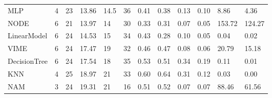\begin{tabular}{lllllrllllll}
MLP & 4 & 23 & 13.86 & 14.5 & 36 & 0.41 & 0.38 & 0.13 & 0.10 & 8.86 & 4.36 \\
NODE & 6 & 21 & 13.97 & 14 & 30 & 0.33 & 0.31 & 0.07 & 0.05 & 153.72 & 124.27 \\
LinearModel & 6 & 24 & 14.53 & 15 & 34 & 0.43 & 0.28 & 0.10 & 0.05 & 0.04 & 0.02 \\
VIME & 6 & 24 & 17.47 & 19 & 32 & 0.46 & 0.47 & 0.08 & 0.06 & 20.79 & 15.18 \\
DecisionTree & 6 & 24 & 17.54 & 18 & 35 & 0.53 & 0.51 & 0.34 & 0.19 & 0.11 & 0.01 \\
KNN & 4 & 25 & 18.97 & 21 & 33 & 0.60 & 0.64 & 0.31 & 0.12 & 0.03 & 0.00 \\
NAM & 3 & 24 & 19.31 & 21 & 16 & 0.51 & 0.52 & 0.07 & 0.07 & 88.46 & 61.56 \\
\bottomrule
\end{tabular}
